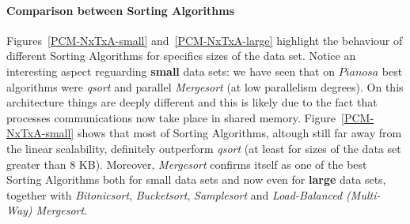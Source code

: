 \paragraph{Comparison between Sorting Algorithms} Figures~\ref{PCM-NxTxA-small} and~\ref{PCM-NxTxA-large} highlight the behaviour of different Sorting Algorithms for specifics sizes of the data set. Notice an interesting aspect reguarding \textbf{small} data sets: we have seen that on $Pianosa$ best algorithms were \textit{qsort} and parallel \textit{Mergesort} (at low parallelism degrees). On this architecture things are deeply different and this is likely due to the fact that processes communications now take place in shared memory. Figure~\ref{PCM-NxTxA-small} shows that most of Sorting Algorithms, altough still far away from the linear scalability, definitely outperform \textit{qsort} (at least for sizes of the data set greater than 8 KB). Moreover, \textit{Mergesort} confirms itself as one of the best Sorting Algorithms both for small data sets and now even for \textbf{large} data sets, together with \textit{Bitonicsort}, \textit{Bucketsort}, \textit{Samplesort} and \textit{Load-Balanced (Multi-Way) Mergesort}.


